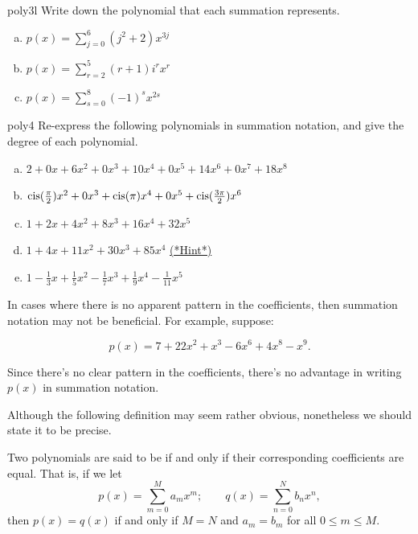 \begin{exercise}{poly3l}
Write down the polynomial that each summation represents.
\begin{enumerate}[(a)]
\item
$p(x)  = \sum_{j=0}^{6}( j^2+2)x^{3j}$
\item
$p(x)  = \sum_{r=2}^{5} (r+1)i^rx^r$
\item
$p(x)  = \sum_{s=0}^{8} (-1)^sx^{2s}$
\end{enumerate}
\end{exercise}

\begin{exercise}{poly4}
Re-express the following polynomials in summation notation,  and give the degree of each polynomial.
\begin{enumerate}[(a)]
\item
$2 + 0x + 6x^2 + 0x^3 + 10x^4 + 0x^5 + 14x^6 +0x^7 +  18x^8$
\item
$\operatorname{cis}(\frac{\pi}{2})x^2 + 0x^3 + \operatorname{cis}(\pi)x^4 + 0x^5  + \operatorname{cis}(\frac{3\pi}{2})x^6$
\item
$1+ 2x + 4x^2 + 8x^3 + 16x^4 + 32x^5$
\item
$1+4x+11x^2+30x^3+85x^4$
\hyperref[sec:polyrings:hints]{(*Hint*)} 
\item
$1-\frac{1}{3}x + \frac{1}{5}x^2 - \frac{1}{7}x^3 + \frac{1}{9}x^4 - \frac{1}{11}x^5$
\end{enumerate}
\end{exercise}

\begin{rem}
In cases where there is no apparent pattern in the coefficients, then summation notation may not be beneficial. For example, suppose:


$$p(x) = 7+ 22x^2 + x^3-6x^6+4x^8-x^9.$$


Since there's no clear pattern in the coefficients, there's no advantage in writing $p(x)$ in summation notation.
\end{rem}
Although the following definition may seem rather obvious, nonetheless we should state it to be precise.

\begin{defn} Two polynomials are said to be   if and only if their corresponding coefficients are equal. That is, if we let    
$$
p(x)  = \sum^{M}_{m=0} a_m x^m; \qquad
q(x)  = \sum^{N}_{n=0} b_n x^n,
$$
then $p(x) = q(x)$ if and only if $M=N$ and $a_m = b_m$ for all $0 \leq m \leq M$.
\end {defn}

